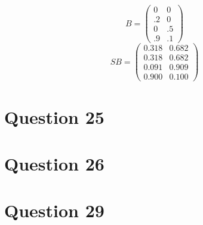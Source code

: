 \documentclass{article}
\begin{document}
   \[ B =\left(\begin{array}{rrrrr}
     0&0\\
   .2 & 0\\
   0 & .5\\
   .9 & .1 
     \end{array}\right)\]
     \[ SB =\left(\begin{array}{rrrrr} 
    0.318  & 0.682\\
   0.318  & 0.682\\
   0.091  & 0.909 \\
   0.900  & 0.100
          \end{array}\right)\]
\section*{Question 25}
\section*{Question 26}
\section*{Question 29}
\end{document}

